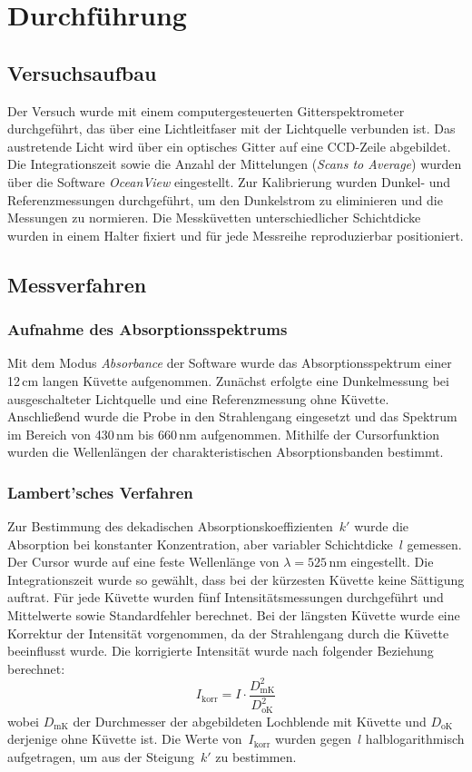 \chapter{Durchführung}
\label{ch:durchfuerung}

\section{Versuchsaufbau}
Der Versuch wurde mit einem computergesteuerten Gitterspektrometer durchgeführt, das über eine Lichtleitfaser mit der Lichtquelle verbunden ist. Das austretende Licht wird über ein optisches Gitter auf eine CCD-Zeile abgebildet. Die Integrationszeit sowie die Anzahl der Mittelungen (\textit{Scans to Average}) wurden über die Software \textit{OceanView} eingestellt. Zur Kalibrierung wurden Dunkel- und Referenzmessungen durchgeführt, um den Dunkelstrom zu eliminieren und die Messungen zu normieren. Die Messküvetten unterschiedlicher Schichtdicke wurden in einem Halter fixiert und für jede Messreihe reproduzierbar positioniert.

\section{Messverfahren}

\subsection{Aufnahme des Absorptionsspektrums}
Mit dem Modus \textit{Absorbance} der Software wurde das Absorptionsspektrum einer 12\,cm langen Küvette aufgenommen. Zunächst erfolgte eine Dunkelmessung bei ausgeschalteter Lichtquelle und eine Referenzmessung ohne Küvette. Anschließend wurde die Probe in den Strahlengang eingesetzt und das Spektrum im Bereich von 430\,nm bis 660\,nm aufgenommen. Mithilfe der Cursorfunktion wurden die Wellenlängen der charakteristischen Absorptionsbanden bestimmt.

\subsection{Lambert'sches Verfahren}
Zur Bestimmung des dekadischen Absorptionskoeffizienten~$k'$ wurde die Absorption bei konstanter Konzentration, aber variabler Schichtdicke~$l$ gemessen. Der Cursor wurde auf eine feste Wellenlänge von $\lambda = 525\,\text{nm}$ eingestellt. Die Integrationszeit wurde so gewählt, dass bei der kürzesten Küvette keine Sättigung auftrat. Für jede Küvette wurden fünf Intensitätsmessungen durchgeführt und Mittelwerte sowie Standardfehler berechnet. Bei der längsten Küvette wurde eine Korrektur der Intensität vorgenommen, da der Strahlengang durch die Küvette beeinflusst wurde. Die korrigierte Intensität wurde nach folgender Beziehung berechnet:
\begin{equation}
    I_\text{korr} = I \cdot \frac{D_\text{mK}^2}{D_\text{oK}^2}
    \label{eq:correction}
\end{equation}
wobei $D_\text{mK}$ der Durchmesser der abgebildeten Lochblende mit Küvette und $D_\text{oK}$ derjenige ohne Küvette ist. Die Werte von~$I_\text{korr}$ wurden gegen~$l$ halblogarithmisch aufgetragen, um aus der Steigung~$k'$ zu bestimmen.

